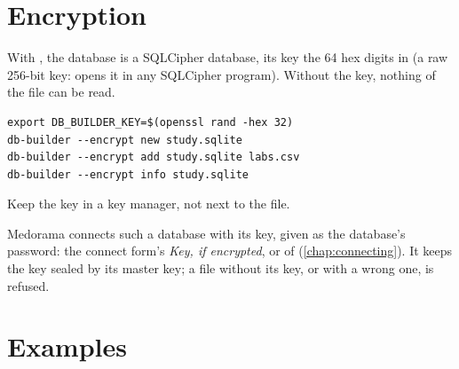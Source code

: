 \section{Encryption}
\label{sec:importing-encryption}

With , the database is a SQLCipher database, its key the 64 hex digits in
 (a raw 256-bit key:  opens it in any
SQLCipher program). Without the key, nothing of the file can be read.
\begin{lstlisting}[style=shell]
export DB_BUILDER_KEY=$(openssl rand -hex 32)
db-builder --encrypt new study.sqlite
db-builder --encrypt add study.sqlite labs.csv
db-builder --encrypt info study.sqlite
\end{lstlisting}
Keep the key in a key manager, not next to the file.

Medorama connects such a database with its key, given as the database's password: the
connect form's \emph{Key, if encrypted}, or  of
 (\cref{chap:connecting}). It keeps the key sealed by its master
key; a file without its key, or with a wrong one, is refused.

\section{Examples}
\label{sec:importing-examples}

